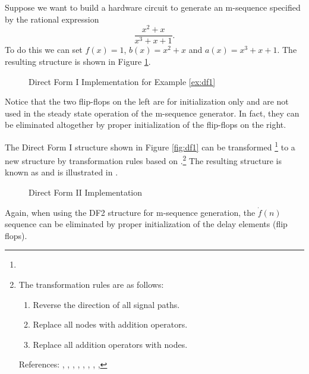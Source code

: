 \begin{example}
\label{ex:df1}
Suppose we want to build a hardware circuit to 
generate an m-sequence specified by the rational expression
\[ \frac{x^2+x}{x^3+x+1}. \]
To do this we can set $f(x)=1$, $b(x)=x^2+x$ and $a(x)=x^3+x+1$.
The resulting structure is shown in Figure \ref{fig:ex-df1}.
\begin{figure}[ht]
\caption{
   Direct Form I Implementation for Example \ref{ex:df1}
   \label{fig:ex-df1}
   }
\end{figure}
Notice that the two flip-flops on the left are for initialization 
only and are not used in the steady state operation of the m-sequence
generator.
In fact, they can be eliminated altogether by proper initialization of 
the flip-flops on the right.
\end{example}

The Direct Form I structure shown in Figure \ref{fig:df1} can be transformed
\footnote{
  }
to a new structure by transformation rules based on 
.\footnote{
   The transformation rules are as follows:
   \begin{enumerate}
   \setlength{\itemsep}{0ex}
   \item Reverse the direction of all signal paths.
   \item Replace all nodes with addition operators.
   \item Replace all addition operators with nodes.
   \end{enumerate}
   References:
   ,
   ,
   ,
   ,
   ,
   ,
   ,
   ,
   }
The resulting structure is known as 
and is illustrated in .
\begin{figure}[ht]
\caption{
   Direct Form II Implementation
   \label{fig:df2}
   }
\end{figure}
Again, when using the DF2 structure for m-sequence generation,
the $\dot{f}(n)$ sequence can be eliminated by proper initialization of
the delay elements (flip flops).
